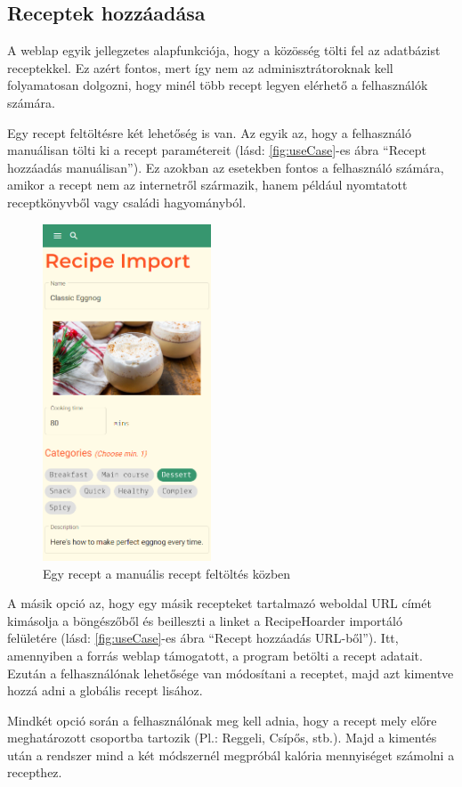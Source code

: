 \documentclass[12pt]{report}
\theoremstyle{definition}
\begin{document}
 
\subsection{Receptek hozzáadása} 
A weblap egyik jellegzetes alapfunkciója, hogy a közösség tölti fel az adatbázist receptekkel. Ez azért fontos, mert így nem az adminisztrátoroknak kell folyamatosan dolgozni, hogy minél több recept legyen elérhető a felhasználók számára. 

Egy recept feltöltésre két lehetőség is van. Az egyik az, hogy a felhasználó manuálisan tölti ki a recept paramétereit (lásd: \ref{fig:useCase}-es ábra “Recept hozzáadás manuálisan”). Ez azokban az esetekben fontos a felhasználó számára, amikor a recept nem az internetről származik, hanem például nyomtatott receptkönyvből vagy családi hagyományból. 

\begin{figure}[H]%
    \centering
    \includegraphics[width=5cm]{pictures/mobile_importDataCheck.png}
	\caption{Egy recept a manuális recept feltöltés közben}%
    \label{fig:importcheck}%
\end{figure}

A másik opció az, hogy egy másik recepteket tartalmazó weboldal URL címét kimásolja a böngészőből és beilleszti a linket a RecipeHoarder importáló felületére (lásd: \ref{fig:useCase}-es ábra “Recept hozzáadás URL-ből”). Itt, amennyiben a forrás weblap támogatott, a program betölti a recept adatait. Ezután a felhasználónak lehetősége van módosítani a receptet, majd azt kimentve hozzá adni a globális recept lisához.

Mindkét opció során a felhasználónak meg kell adnia, hogy a recept mely előre meghatározott csoportba tartozik (Pl.: Reggeli, Csípős, stb.). Majd a kimentés után a rendszer mind a két módszernél megpróbál kalória mennyiséget számolni a recepthez.
\end{document}
